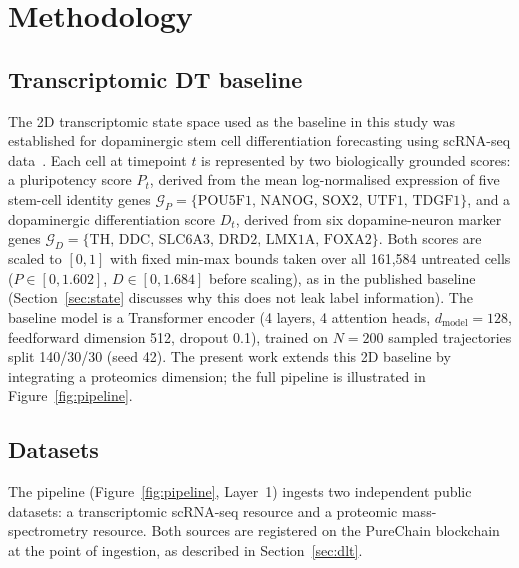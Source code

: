 \documentclass[5p,times,twocolumn]{elsarticle}
\newcommand{\rtag}[1]{}
\newcommand{\rev}[2]{\rtag{#1}#2}
\newcommand{\lang}[1]{#1}
\begin{document}
\section{Methodology}

\subsection{\textbf{Transcriptomic DT baseline}}
\label{sec:baseline}

The 2D transcriptomic state space used as
the baseline in this study was established for dopaminergic
stem cell differentiation forecasting using scRNA-seq data~\cite{kanu2026transformer}.
Each cell at timepoint $t$ is represented by two biologically
grounded scores: a pluripotency score $P_{t}$, derived from
the mean log-normalised expression of five stem-cell identity
genes
$\mathcal{G}_{P} = \{\text{POU5F1, NANOG, SOX2, UTF1, TDGF1}\}$,
and a dopaminergic differentiation score $D_{t}$, derived
from six dopamine-neuron marker genes
$\mathcal{G}_{D} = \{\text{TH, DDC, SLC6A3, DRD2, LMX1A, FOXA2}\}$.
\rev{R2.6,AC}{Both scores are scaled to $[0,1]$ with fixed
  min-max bounds taken over all 161,584 untreated cells
  ($P \in [0, 1.602]$, $D \in [0, 1.684]$ before scaling), as in
  the published baseline (Section~\ref{sec:state} discusses why
  this does not leak label information).}
\lang{The baseline model is a} Transformer encoder (4 layers, 4 attention heads,
$d_{\text{model}} = 128$, feedforward dimension 512,
dropout 0.1)\lang{,} trained on $N = 200$ sampled trajectories
split 140/30/30 (seed 42).
The present work extends this 2D baseline by integrating
a proteomics dimension; the full pipeline is illustrated
in Figure~\ref{fig:pipeline}.

\subsection{\textbf{Datasets}}
\label{sec:datasets}

The pipeline (Figure~\ref{fig:pipeline}, Layer~1) ingests two
independent public datasets: a transcriptomic scRNA-seq
resource and a proteomic mass-spectrometry resource.
Both sources are registered on the PureChain blockchain at
the point of ingestion, as described in
Section~\ref{sec:dlt}.
\end{document}
